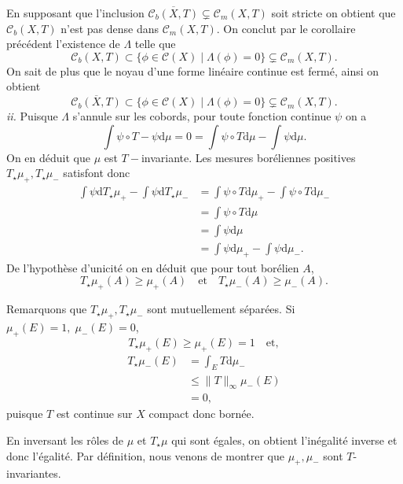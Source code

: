 \documentclass[12pt]{article}
\newcommand{\de}{\mathrm{d}}
\begin{document}
En supposant que l'inclusion $\overline{\mathcal{C}_{b}(X,T)} \subsetneq \mathcal{C}_{m}(X,T)$ soit stricte on obtient que $\mathcal{C}_{b}(X,T)$ n'est pas dense dans $\mathcal{C}_{m}(X,T)$. On conclut par le corollaire précédent l'existence de $\Lambda$ telle que  \[
        \mathcal{C}_{b}(X,T) \subset \{\phi \in \mathcal{C}(X) \;|\; \Lambda(\phi) = 0\} \subsetneq \mathcal{C}_{m}(X,T) 
.\] 
On sait de plus que le noyau d'une forme linéaire continue est fermé, ainsi on obtient \[
        \overline{\mathcal{C}_{b}(X,T)} \subset \{\phi \in \mathcal{C}(X) \;|\; \Lambda(\phi) = 0\} \subsetneq \mathcal{C}_{m}(X,T) 
.\]  
\textit{ii.} Puisque $\Lambda$ s'annule sur les cobords, pour toute fonction continue $\psi$ on a  \[
\int\psi\circ T -\psi\de\mu = 0 = \int\psi\circ T\de\mu - \int\psi\de\mu
.\] On en déduit que $\mu$ est $T-$invariante. Les mesures boréliennes positives $T_{\star}\mu_{+}, T_{\star}\mu_{-}$ satisfont donc
\begin{align*}
        \int\psi\de T_{\star}\mu_{+} - \int\psi\de T_{\star}\mu_{-} &= \int\psi \circ T\de\mu_{+} - \int\psi \circ T\de\mu_{-} \\ 
                                                                    &= \int\psi\circ T\de\mu \\
                                                                    &= \int\psi\de\mu \\
                                                                    &= \int\psi\de\mu_{+} - \int\psi\de\mu_{-} 
.\end{align*}
De l'hypothèse d'unicité on en déduit que pour tout borélien $A$, \[
        T_{\star}\mu_{+}(A) \ge \mu_{+}(A) \quad \text{et} \quad T_{\star}\mu_{-}(A) \ge \mu_{-}(A)
.\] 

Remarquons que $T_{\star}\mu_{+}, T_{\star}\mu_{-}$ sont mutuellement séparées. Si $\mu_{+}(E) = 1, \; \mu_{-}(E) = 0$,
\[
        T_{\star}\mu_{+}(E) \ge \mu_{+}(E) = 1 \quad \text{et}
,\] 
\begin{align*}
        T_{\star}\mu_{-}(E) &= \int_{E}T\de\mu_{-} \\
                            &\le \|T\|_{\infty}\mu_{-}(E) \\
                            &= 0
,\end{align*} puisque $T$ est continue sur $X$ compact donc bornée.

En inversant les rôles de $\mu$ et $T_{\star}\mu$ qui sont égales, on obtient l'inégalité inverse et donc l'égalité. Par définition, nous venons de montrer que $\mu_{+}, \mu_{-}$ sont $T$-invariantes.
\end{document}
